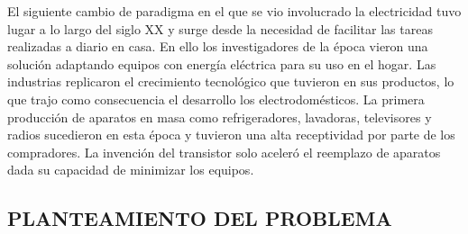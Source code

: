 \documentclass[12pt,letterpaper]{article}
\begin{document}
El siguiente cambio de paradigma en el que se vio involucrado la electricidad tuvo lugar a lo largo del siglo XX y surge desde la necesidad de facilitar las tareas realizadas a diario en casa. En ello los investigadores de la época vieron una solución adaptando equipos con energía eléctrica para su uso en el hogar. Las industrias replicaron el crecimiento tecnológico que tuvieron en sus productos, lo que trajo como consecuencia el desarrollo los electrodomésticos. La primera producción de aparatos en masa como refrigeradores, lavadoras, televisores y radios sucedieron en esta época y tuvieron una alta receptividad por parte de los compradores. La invención del transistor solo aceleró el reemplazo de aparatos dada su capacidad de minimizar los equipos.\\



\newpage

		
\begin{center}
		\section*{ PLANTEAMIENTO DEL PROBLEMA}

\end{center}
\end{document}
